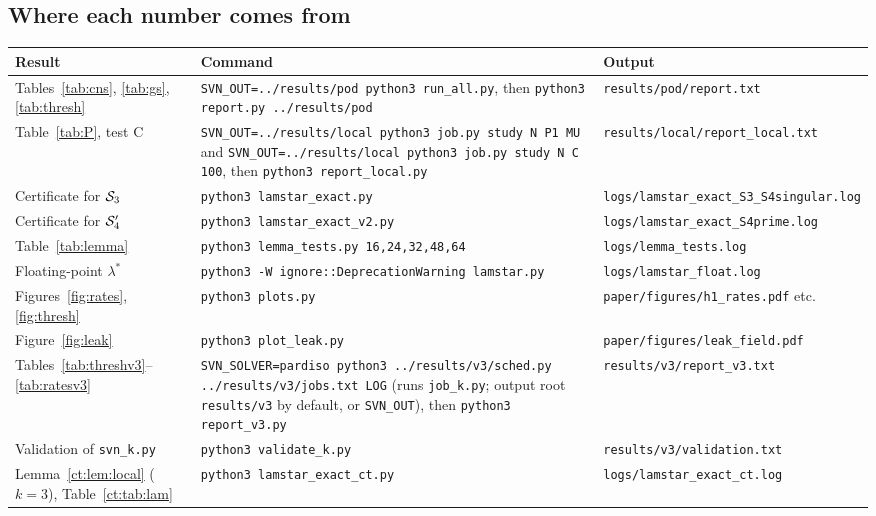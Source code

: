 \subsection*{Where each number comes from}
{\small
\begin{longtable}{>{\raggedright\arraybackslash}p{}>{\raggedright\arraybackslash}p{}>{\raggedright\arraybackslash}p{}}
\toprule
Result & Command & Output\\
\midrule
\endhead
Tables~\ref{tab:cns}, \ref{tab:gs}, \ref{tab:thresh} & \texttt{SVN\_OUT=../results/pod python3 run\_all.py}, then \texttt{python3 report.py ../results/pod} & \texttt{results/pod/report.txt}\\
Table~\ref{tab:P}, test C & \texttt{SVN\_OUT=../results/local python3 job.py study N P1 MU} and \texttt{SVN\_OUT=../results/local python3 job.py study N C 100}, then \texttt{python3 report\_local.py} & \texttt{results/local/report\_local.txt}\\
Certificate for $\mathcal S_3$ & \texttt{python3 lamstar\_exact.py} & \texttt{logs/lamstar\_exact\_\allowbreak S3\_S4singular.log}\\
Certificate for $\mathcal S_4'$ & \texttt{python3 lamstar\_exact\_v2.py} & \texttt{logs/lamstar\_exact\_S4prime.log}\\
Table~\ref{tab:lemma} & \texttt{python3 lemma\_tests.py 16,24,32,48,64} & \texttt{logs/lemma\_tests.log}\\
Floating-point $\lambda^\ast$ & \texttt{python3 -W ignore::DeprecationWarning lamstar.py} & \texttt{logs/lamstar\_float.log}\\
Figures~\ref{fig:rates}, \ref{fig:thresh} & \texttt{python3 plots.py} & \texttt{paper/figures/}\allowbreak\texttt{h1\_rates.pdf} etc.\\
Figure~\ref{fig:leak} & \texttt{python3 plot\_leak.py} & \texttt{paper/figures/}\allowbreak\texttt{leak\_field.pdf}\\
Tables~\ref{tab:threshv3}--\ref{tab:ratesv3} & \texttt{SVN\_SOLVER=pardiso python3 ../results/v3/sched.py ../results/v3/jobs.txt LOG} (runs \texttt{job\_k.py}; output root \texttt{results/v3} by default, or \texttt{SVN\_OUT}), then \texttt{python3 report\_v3.py} & \texttt{results/v3/}\allowbreak\texttt{report\_v3.txt}\\
Validation of \texttt{svn\_k.py} & \texttt{python3 validate\_k.py} & \texttt{results/v3/}\allowbreak\texttt{validation.txt}\\
Lemma~\ref{ct:lem:local} ($k=3$), Table~\ref{ct:tab:lam} & \texttt{python3 lamstar\_exact\_ct.py} & \texttt{logs/lamstar\_}\allowbreak\texttt{exact\_ct.log}\\

\end{longtable}}
